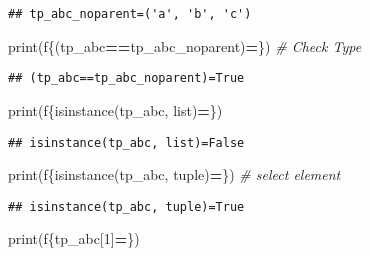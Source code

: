 \documentclass[
]{book}
\newenvironment{Shaded}{\begin{snugshade}}{\end{snugshade}}
\newcommand{\BuiltInTok}[1]{#1}
\newcommand{\CommentTok}[1]{\textcolor[rgb]{0.56,0.35,0.01}{\textit{#1}}}
\newcommand{\DecValTok}[1]{\textcolor[rgb]{0.00,0.00,0.81}{#1}}
\newcommand{\NormalTok}[1]{#1}
\newcommand{\OperatorTok}[1]{\textcolor[rgb]{0.81,0.36,0.00}{\textbf{#1}}}
\newcommand{\SpecialCharTok}[1]{\textcolor[rgb]{0.00,0.00,0.00}{#1}}
\newcommand{\SpecialStringTok}[1]{\textcolor[rgb]{0.31,0.60,0.02}{#1}}
\begin{document}
\begin{verbatim}
## tp_abc_noparent=('a', 'b', 'c')
\end{verbatim}

\begin{Shaded}
\begin{Highlighting}[]
\BuiltInTok{print}\NormalTok{(}\SpecialStringTok{f\textquotesingle{}}\SpecialCharTok{\{}\NormalTok{(tp\_abc}\OperatorTok{==}\NormalTok{tp\_abc\_noparent)}\OperatorTok{=}\SpecialCharTok{\}}\SpecialStringTok{\textquotesingle{}}\NormalTok{)}
\CommentTok{\# Check Type}
\end{Highlighting}
\end{Shaded}

\begin{verbatim}
## (tp_abc==tp_abc_noparent)=True
\end{verbatim}

\begin{Shaded}
\begin{Highlighting}[]
\BuiltInTok{print}\NormalTok{(}\SpecialStringTok{f\textquotesingle{}}\SpecialCharTok{\{}\BuiltInTok{isinstance}\NormalTok{(tp\_abc, }\BuiltInTok{list}\NormalTok{)}\OperatorTok{=}\SpecialCharTok{\}}\SpecialStringTok{\textquotesingle{}}\NormalTok{)}
\end{Highlighting}
\end{Shaded}

\begin{verbatim}
## isinstance(tp_abc, list)=False
\end{verbatim}

\begin{Shaded}
\begin{Highlighting}[]
\BuiltInTok{print}\NormalTok{(}\SpecialStringTok{f\textquotesingle{}}\SpecialCharTok{\{}\BuiltInTok{isinstance}\NormalTok{(tp\_abc, }\BuiltInTok{tuple}\NormalTok{)}\OperatorTok{=}\SpecialCharTok{\}}\SpecialStringTok{\textquotesingle{}}\NormalTok{)}
\CommentTok{\# select element}
\end{Highlighting}
\end{Shaded}

\begin{verbatim}
## isinstance(tp_abc, tuple)=True
\end{verbatim}

\begin{Shaded}
\begin{Highlighting}[]
\BuiltInTok{print}\NormalTok{(}\SpecialStringTok{f\textquotesingle{}}\SpecialCharTok{\{}\NormalTok{tp\_abc[}\DecValTok{1}\NormalTok{]}\OperatorTok{=}\SpecialCharTok{\}}\SpecialStringTok{\textquotesingle{}}\NormalTok{)}
\end{Highlighting}
\end{Shaded}
\end{document}
